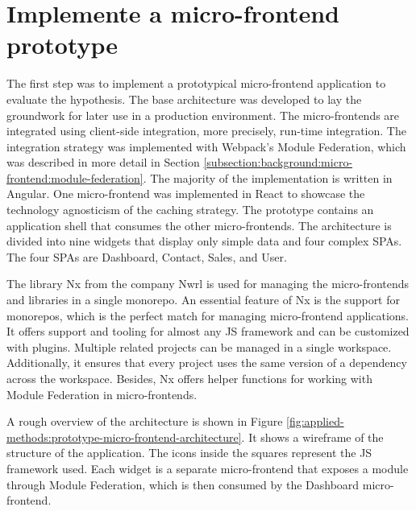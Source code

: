 \section{Implemente a micro-frontend prototype}\label{section:applied-methods:prototypical-implementation}

The first step was to implement a prototypical micro-frontend application to evaluate the hypothesis. The base architecture was developed to lay the groundwork for later use in a production environment. The micro-frontends are integrated using client-side integration, more precisely, run-time integration. The integration strategy was implemented with Webpack's Module Federation, which was described in more detail in Section \ref{subsection:background:micro-frontend:module-federation}. The majority of the implementation is written in Angular. One micro-frontend was implemented in React to showcase the technology agnosticism of the caching strategy. The prototype contains an application shell that consumes the other micro-frontends. The architecture is divided into nine widgets that display only simple data and four complex 
\acp{SPA}. The four \acp{SPA} are Dashboard, Contact, Sales, and User.

\bigskip

\noindent The library Nx from the company Nwrl is used for managing the micro-frontends and libraries in a single monorepo. An essential feature of Nx is the support for monorepos, which is the perfect match for managing micro-frontend applications. It offers support and tooling for almost any \ac{JS} framework and can be customized with plugins. Multiple related projects can be managed in a single workspace. Additionally, it ensures that every project uses the same version of a dependency across the workspace. Besides, Nx offers helper functions for working with Module Federation in micro-frontends. \cite{misc:-:applied-methods:intro-to-nx}

\bigskip

\noindent A rough overview of the architecture is shown in Figure \ref{fig:applied-methods:prototype-micro-frontend-architecture}. It shows a wireframe of the structure of the application. The icons inside the squares represent the \ac{JS} framework used. Each widget is a separate micro-frontend that exposes a module through Module Federation, which is then consumed by the Dashboard micro-frontend.

